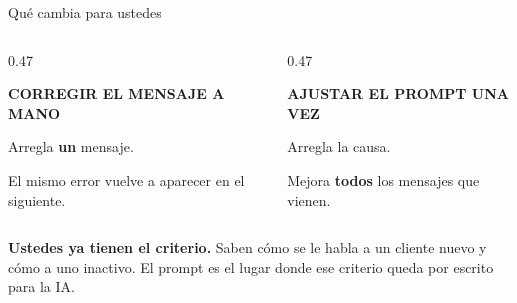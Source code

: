 \documentclass[aspectratio=169,10pt]{beamer}
\begin{document}
\begin{frame}{Qué cambia para ustedes}
\vspace{0.3cm}
\begin{columns}[T,onlytextwidth]
\begin{column}{0.47\textwidth}
\begin{caja}
{\scriptsize\bfseries\color{mitGris}CORREGIR EL MENSAJE A MANO\par}
\vspace{5pt}
Arregla \textbf{un} mensaje.\par
\vspace{3pt}
{\small\color{mitGris}El mismo error vuelve a aparecer en el siguiente.\par}
\end{caja}
\end{column}
\begin{column}{0.47\textwidth}
\begin{caja}[mitRojo]
{\scriptsize\bfseries\color{mitRojo}AJUSTAR EL PROMPT UNA VEZ\par}
\vspace{5pt}
Arregla la causa.\par
\vspace{3pt}
{\small\color{mitGris}Mejora \textbf{todos} los mensajes que vienen.\par}
\end{caja}
\end{column}
\end{columns}

\vspace{0.45cm}
\begin{destacado}
\textbf{Ustedes ya tienen el criterio.} Saben cómo se le habla a un cliente
nuevo y cómo a uno inactivo. El prompt es el lugar donde ese criterio queda
por escrito para la IA.
\end{destacado}
\end{frame}
\end{document}
